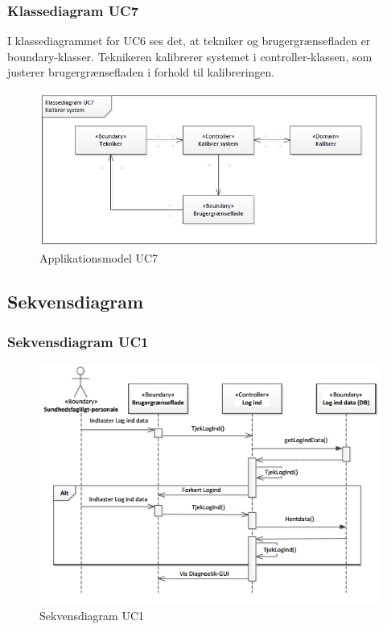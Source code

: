 \subsubsection{Klassediagram UC7}
I klassediagrammet for UC6 ses det, at tekniker og brugergrænsefladen er boundary-klasser. Teknikeren kalibrerer systemet i controller-klassen, som justerer brugergrænsefladen i forhold til kalibreringen. 
\begin{figure}[H]
\centering
\includegraphics[scale=0.70]{app7.PNG}
\caption{Applikationsmodel UC7}
\end{figure}

\newpage

\subsection{Sekvensdiagram}

\subsubsection{Sekvensdiagram UC1}
\begin{figure}[H]
\centering
\includegraphics[scale=0.70]{sd1.PNG}
\caption{Sekvensdiagram UC1}
\end{figure}

